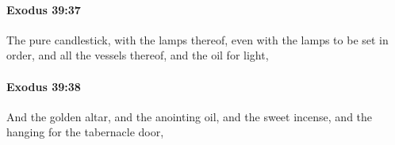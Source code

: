 		\paragraph{Exodus 39:37} %
			\label{EXODUS-39-37}

			The pure candlestick, with the lamps thereof, even with the lamps to be set in order, and all the vessels thereof, and the oil for light,


		\paragraph{Exodus 39:38} %
			\label{EXODUS-39-38}

			And the golden altar, and the anointing oil, and the sweet incense, and the hanging for the tabernacle door,


